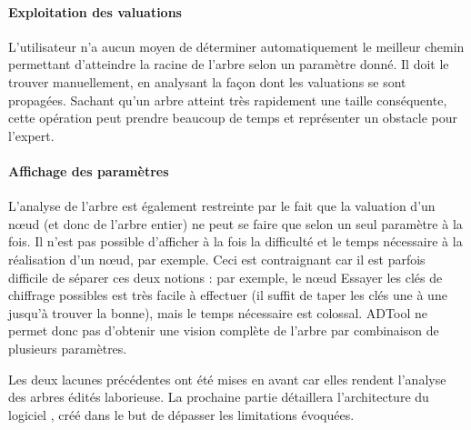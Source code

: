 	\paragraph{Exploitation des valuations} L'utilisateur n'a aucun moyen de déterminer automatiquement le \og meilleur chemin \fg{} permettant d'atteindre la racine de l'arbre selon un paramètre donné. Il doit le trouver manuellement, en analysant la façon dont les valuations se sont propagées. Sachant qu'un arbre atteint très rapidement une taille conséquente, cette opération peut prendre beaucoup de temps et représenter un obstacle pour l'expert.

	\paragraph{Affichage des paramètres} L'analyse de l'arbre est également restreinte par le fait que la valuation d'un nœud (et donc de l'arbre entier) ne peut se faire que selon un seul paramètre à la fois. Il n'est pas possible d'afficher à la fois la \og difficulté \fg{} et le \og temps nécessaire \fg{} à la réalisation d'un nœud, par exemple. Ceci est contraignant car il est parfois difficile de séparer ces deux notions : par exemple, le nœud \og Essayer les clés de chiffrage possibles \fg{} est très facile à effectuer (il suffit de taper les clés une à une jusqu'à trouver la bonne), mais le temps nécessaire est colossal. ADTool ne permet donc pas d'obtenir une vision complète de l'arbre par combinaison de plusieurs paramètres.

	Les deux lacunes précédentes ont été mises en avant car elles rendent l'analyse des arbres édités laborieuse. La prochaine partie détaillera l'architecture du logiciel \glasir{}, créé dans le but de dépasser les limitations évoquées.
